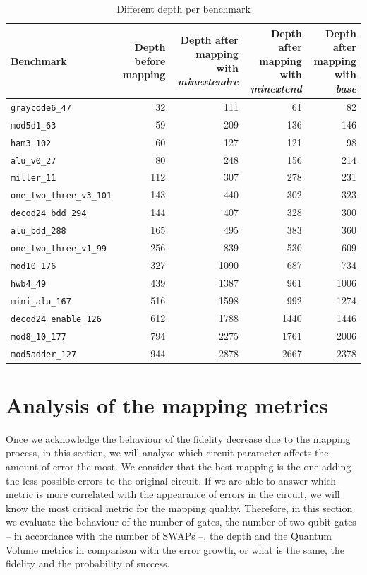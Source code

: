 \begin{table}[htbp]
\caption{\label{tab:depth_per_bench}
Different depth per benchmark}
\centering
\tiny
\begin{tabular}{lrrrr}
\hline
Benchmark & Depth before mapping & Depth after mapping with \emph{minextendrc} & Depth after mapping with \emph{minextend} & Depth after mapping with \emph{base}\\
\hline
\texttt{graycode6\_47} & 32 & 111 & 61 & 82\\
\texttt{mod5d1\_63} & 59 & 209 & 136 & 146\\
\texttt{ham3\_102} & 60 & 127 & 121 & 98\\
\texttt{alu\_v0\_27} & 80 & 248 & 156 & 214\\
\texttt{miller\_11} & 112 & 307 & 278 & 231\\
\texttt{one\_two\_three\_v3\_101} & 143 & 440 & 302 & 323\\
\texttt{decod24\_bdd\_294} & 144 & 407 & 328 & 300\\
\texttt{alu\_bdd\_288} & 165 & 495 & 383 & 360\\
\texttt{one\_two\_three\_v1\_99} & 256 & 839 & 530 & 609\\
\texttt{mod10\_176} & 327 & 1090 & 687 & 734\\
\texttt{hwb4\_49} & 439 & 1387 & 961 & 1006\\
\texttt{mini\_alu\_167} & 516 & 1598 & 992 & 1274\\
\texttt{decod24\_enable\_126} & 612 & 1788 & 1440 & 1446\\
\texttt{mod8\_10\_177} & 794 & 2275 & 1761 & 2006\\
\texttt{mod5adder\_127} & 944 & 2878 & 2667 & 2378\\
\hline
\end{tabular}
\end{table}

\section{Analysis of the mapping metrics}
\label{sec:orgb1f6186}
Once we acknowledge the behaviour of the fidelity decrease due to the mapping process, in this section, we will analyze which circuit parameter affects the amount of error the most.
We consider that the best mapping is the one adding the less possible errors to the original circuit.
If we are able to answer which metric is more correlated with the appearance of errors in the circuit, we will know the most critical metric for the mapping quality.
Therefore, in this section we evaluate the behaviour of the number of gates, the number of two-qubit gates -- in accordance with the number of SWAPs --, the depth and the Quantum Volume metrics in comparison with the error growth, or what is the same, the fidelity and the probability of success.


